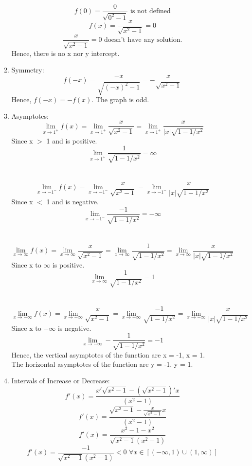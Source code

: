 \documentclass[12pt]{article}
\begin{document}
\begin{enumerate}
\begin{enumerate}
                \[f(0) = \frac{0}{\sqrt{0^2 - 1}} \text{ is not defined}\]
                \[f(x) = \frac{x}{\sqrt{x^2 - 1}} = 0\]
                \[\frac{x}{\sqrt{x^2 - 1}} = 0 \text{ doesn't have any solution.}\]
                Hence, there is no x nor y intercept.
                \newpage
            \item Symmetry:
                \[f(-x) = \frac{-x}{\sqrt{(-x)^2 - 1}} = -\frac{x}{\sqrt{x^2 - 1}}\]
                Hence, $f(-x) = -f(x)$. The graph is odd.
            \item Asymptotes:
                \[\lim_{x \to 1^+} f(x) = \lim_{x \to 1^+} \frac{x}{\sqrt{x^2 - 1}} = \lim_{x \to 1^+} \frac{x}{|x|\sqrt{1 - 1/x^2}} \]
                Since x $>$ 1 and is positive. 
                \[\lim_{x \to 1^+} \frac{1}{\sqrt{1 - 1/x^2}} = \infty\]
                ~\\~\\
                \[\lim_{x \to -1^-} f(x) = \lim_{x \to -1^-} \frac{x}{\sqrt{x^2 - 1}} = 
                \lim_{x \to -1^-} \frac{x}{|x|\sqrt{1 - 1/x^2}}\]
                Since x $<$ 1 and is negative. 
                \[\lim_{x \to -1^-} \frac{-1}{\sqrt{1 - 1/x^2}} = -\infty\]
                ~\\~\\
                \[\lim_{x \to \infty} f(x) = \lim_{x \to \infty} \frac{x}{\sqrt{x^2 - 1}} =
                \lim_{x \to \infty} \frac{1}{\sqrt{1 - 1/x^2}} = \lim_{x \to \infty} \frac{x}{|x|\sqrt{1 - 1/x^2}}\]
                Since x to $\infty$ is positive.
                \[\lim_{x \to \infty} \frac{1}{\sqrt{1 - 1/x^2}} = 1\]
                ~\\~\\
                \[\lim_{x \to -\infty} f(x) = \lim_{x \to -\infty} \frac{x}{\sqrt{x^2 - 1}} = \lim_{x \to -\infty} \frac{-1}{\sqrt{1 - 1/x^2}} = \lim_{x \to -\infty} \frac{x}{|x|\sqrt{1 - 1/x^2}}\]
                Since x to $-\infty$ is negative.
                \[\lim_{x \to -\infty} -\frac{1}{\sqrt{1 - 1/x^2}} = -1\]
                Hence, the vertical asymptotes of the function are x = -1, x = 1.\\
                The horizontal asymptotes of the function are y = -1, y = 1.
            \item Intervals of Increase or Decrease:
                \[f'(x) = \frac{x'\sqrt{x^2-1}-(\sqrt{x^2-1})'x}{(x^2 - 1)}\]
                \[f'(x) = \frac{\sqrt{x^2-1}-\frac{x}{\sqrt{x^2-1}}x}{(x^2 - 1)}\]
                \[f'(x) = \frac{x^2-1-x^2}{\sqrt{x^2-1}(x^2 - 1)}\]
                \[f'(x) = \frac{-1}{\sqrt{x^2-1}(x^2 - 1)} < 0 \text{~} \forall x \in [(-\infty,1)\cup (1, \infty)]\]

\end{enumerate}
\end{enumerate}
\end{document}

